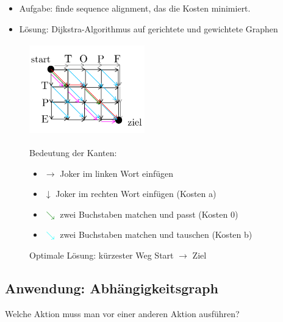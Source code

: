 \documentclass[11pt, fleqn]{scrreprt}
\begin{document}
	\begin{itemize}[label={}]
		\item Aufgabe: finde sequence alignment, das die Kosten minimiert.
		\item Lösung: Dijkstra-Algorithmus auf gerichtete und gewichtete Graphen
	\end{itemize}
	
	\begin{figure}[htbp]
		\begin{minipage}{5cm}
			\vspace*{0mm}
			\includegraphics[width=5cm,height=4cm,keepaspectratio]{./Pictures/Dijkstragitter.png}
		\end{minipage}
		\begin{minipage}{10cm}
			\vspace*{0mm}
			Bedeutung der Kanten: 
			\begin{itemize}
				\item $\rightarrow$ Joker im linken Wort einfügen
				\item $\downarrow$ Joker im rechten Wort einfügen (Kosten a)
				\item \textcolor{green}{$\searrow$} zwei Buchstaben matchen und passt (Kosten 0)
				\item \textcolor{cyan}{$\searrow$} zwei Buchstaben matchen und tauschen (Kosten b)
			\end{itemize}
			Optimale Lösung: kürzester Weg Start $\rightarrow$ Ziel
		\end{minipage}
	\end{figure}
	
	\subsection*{Anwendung: Abhängigkeitsgraph}

	Welche Aktion muss man vor einer anderen Aktion ausführen? \\
	
\end{document}
